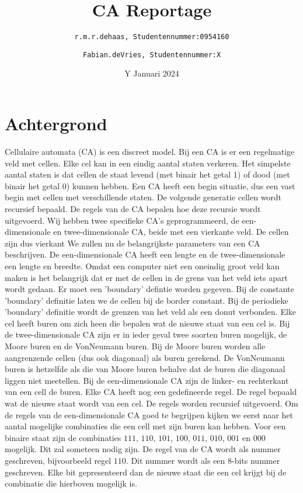 \documentclass[12pt,a4paper]{article}
\title{CA Reportage}
\author{
\texttt{r.m.r.dehaas, \hspace{6pt} 
Studentennummer:\hspace{2pt}0954160}
\and
\texttt{Fabian.deVries, \hspace{6pt}
Studentennummer:\hspace{2pt}X}}
\date{Y Januari 2024}
\begin{document}
\maketitle
\section*{Achtergrond}
Cellulaire automata (CA) is een discreet model. 
Bij een CA is er een regelmatige veld met cellen. 
Elke cel kan in een eindig aantal staten verkeren.
Het simpelste aantal staten is dat cellen 
de staat levend (met binair het getal 1) of dood (met binair het getal 0) kunnen hebben.
Een CA heeft een begin situatie, dus een vast begin met cellen met verschillende staten.
De volgende generatie cellen wordt recursief bepaald. 
De regels van de CA bepalen hoe deze recursie wordt uitgevoerd.
Wij hebben twee specifieke CA's geprogrammeerd, de een-dimensionale en 
twee-dimensionale CA, beide met een vierkante veld. 
De cellen zijn dus vierkant  
We zullen nu de belangrijkste parameters van een CA beschrijven.
De een-dimensionale CA heeft een lengte en de twee-dimensionale een lengte en breedte.
Omdat een computer niet een oneindig groot veld kan maken is het belangrijk dat 
er met de cellen in de grens van het veld iets apart wordt gedaan. Er moet een 'boundary' defintie worden gegeven.
Bij de constante 'boundary' definitie laten we de cellen bij de border constant.
Bij de periodieke 'boundary' definitie wordt de grenzen van het veld als een donut verbonden.
Elke cel heeft buren om zich heen die bepalen wat de nieuwe staat van een cel is.
Bij de twee-dimensionale CA zijn er in ieder geval twee soorten buren mogelijk, de Moore buren en de VonNeumann buren.
Bij de Moore buren worden alle aangrenzende cellen (dus ook diagonaal) als buren gerekend.
De VonNeumann buren is hetzelfde als die van Moore buren behalve dat de buren die diagonaal liggen niet meetellen.
Bij de een-dimensionale CA zijn de linker- en rechterkant van een cell de buren.
Elke CA heeft nog een gedefineerde regel. De regel bepaald wat de nieuwe staat wordt van een cel.
De regels worden recursief uitgevoerd.
Om de regels van de een-dimensionale CA goed te begrijpen kijken we eerst naar het aantal mogelijke combinaties die een cell met zijn buren kan hebben.
Voor een binaire staat zijn de combinaties $111$, $110$, $101$, $100$, $011$, $010$, $001$ en $000$ mogelijk.
Dit zal someteen nodig zijn.
De regel van de CA wordt als nummer geschreven, bijvoorbeeld regel $110$.
Dit nummer wordt als een 8-bits nummer geschreven. 
Elke bit gepresenteerd dan de nieuwe staat die een cel krijgt bij de combinatie die hierboven mogelijk is.
\end{document}
